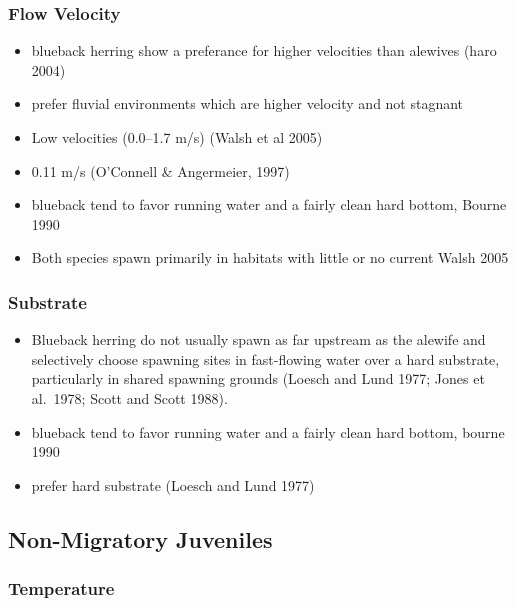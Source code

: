 \documentclass[
]{book}
\providecommand{\tightlist}{%
  \setlength{\itemsep}{0pt}\setlength{\parskip}{0pt}}
\begin{document}
\hypertarget{flow-velocity-3}{%
\subsubsection{Flow Velocity}\label{flow-velocity-3}}

\begin{itemize}
\tightlist
\item
  blueback herring show a preferance for higher velocities than alewives (haro 2004)
\item
  prefer fluvial environments which are higher velocity and not stagnant
\item
  Low velocities (0.0--1.7 m/s) (Walsh et al 2005)
\item
  0.11 m/s (O'Connell \& Angermeier, 1997)
\item
  blueback tend to favor running water and a fairly clean hard bottom, Bourne 1990
\item
  Both species spawn primarily in habitats with little or no current Walsh 2005
\end{itemize}

\hypertarget{substrate-3}{%
\subsubsection{Substrate}\label{substrate-3}}

\begin{itemize}
\item
  Blueback herring do not usually spawn as far upstream as the alewife and selectively choose spawning sites in fast-flowing water over a hard substrate, particularly in shared spawning grounds (Loesch and Lund 1977; Jones et al.~1978; Scott and Scott 1988).
\item
  blueback tend to favor running water and a fairly clean hard bottom, bourne 1990
\item
  prefer hard substrate (Loesch and Lund 1977)
\end{itemize}

\hypertarget{non-migratory-juveniles-1}{%
\subsection{Non-Migratory Juveniles}\label{non-migratory-juveniles-1}}

\hypertarget{temperature-4}{%
\subsubsection{Temperature}\label{temperature-4}}
\end{document}
